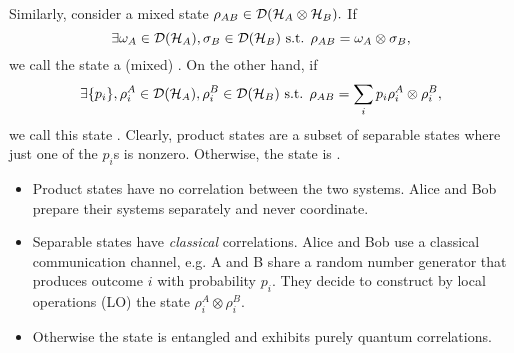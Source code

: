 Similarly, consider a mixed state $\rho_{AB}\in \mathcal{D}(\mathcal H_A \otimes \mathcal H_B).$ If
\begin{equation}
    \exists \omega_A\in \mathcal{D}(\mathcal H_A), \sigma_B \in \mathcal{D}(\mathcal H_B)\text{ s.t. }\rho_{AB} =\omega_A \otimes \sigma_B,
\end{equation}
we call the state a (mixed) . On the other hand, if
\begin{equation}
    \exists \{p_i\}, \rho_i^A \in \mathcal{D}(\mathcal H_A), \rho_i^B \in \mathcal{D}(\mathcal H_B) \text{ s.t. } \rho_{AB}=\sum_i p_i \rho_i^A \otimes \rho_i^B,
\end{equation}
we call this state . Clearly, product states are a subset of separable states where just one of the $p_i$s is nonzero. Otherwise, the state is .
\begin{itemize}
    \item Product states have no correlation between the two systems. Alice and Bob prepare their systems separately and never coordinate.
    \item Separable states have \emph{classical} correlations. Alice and Bob use a classical communication channel, e.g. A and B share a random number generator that produces outcome $i$ with probability $p_i$. They decide to construct by local operations (LO) the state $\rho_i^A \otimes \rho_i^B$.
    \item Otherwise the state is entangled and exhibits purely quantum correlations.
\end{itemize}